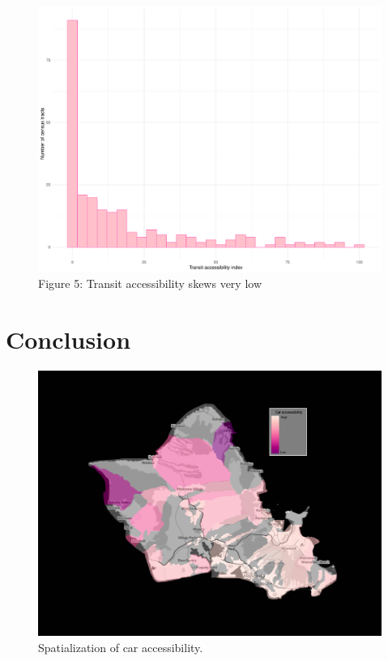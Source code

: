 \documentclass[
]{article}
\begin{document}
\begin{figure}

{\centering \includegraphics[width=1\linewidth]{transit_barchart} 

}

\caption{Figure 5: Transit accessibility skews very low}\label{fig:figurename5}
\end{figure}

\hypertarget{conclusion}{%
\section{Conclusion}\label{conclusion}}

\begin{figure}

{\centering \includegraphics[width=1\linewidth]{car_access} 

}

\caption{Spatialization of car accessibility.}\label{fig:figurename6}
\end{figure}
\end{document}
